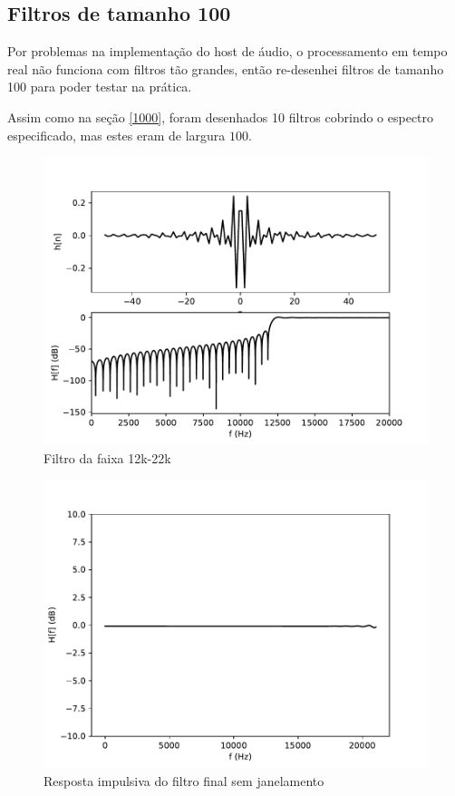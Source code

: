 \subsection{Filtros de tamanho 100}

\begin{multicols}{2}
Por problemas na implementação do host de áudio, o processamento em tempo real não funciona com filtros tão grandes, então re-desenhei filtros de tamanho 100 para poder testar na prática.

Assim como na seção \ref{1000}, foram desenhados 10 filtros cobrindo o espectro especificado, mas estes eram de largura $100$.

\begin{figure}[H]
    \centering
    \includegraphics[scale=0.5]{fig/100/Hamming/filter9.pdf}
    \caption{Filtro da faixa 12k-22k}
    \label{fig:fnowindow}
\end{figure}

\begin{figure}[H]
    \centering
    \includegraphics[scale=0.5]{fig/100/Hamming/nowindow.pdf}
    \caption{Resposta impulsiva do filtro final sem janelamento}
    \label{fig:imp resp total}
\end{figure}


\end{multicols}
